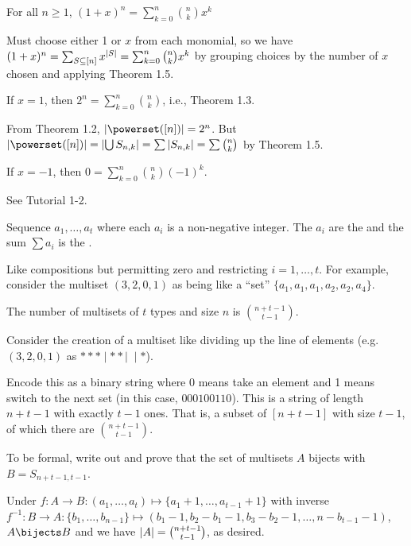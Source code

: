 \begin{theorem}
  For all $n \geq 1$, $(1+x)^n = \sum_{k=0}^n \binom{n}{k}x^k$
\end{theorem}
\begin{prf}
  Must choose either 1 or $x$ from each monomial,
  so we have $(1+x)^n = \sum_{S \subseteq [n]} x^{\abs{S}} = \sum_{k=0}^n\binom{n}{k}x^k$
  by grouping choices by the number of $x$ chosen and applying Theorem 1.5.
\end{prf}

\begin{corollary}
  If $x=1$, then $2^n = \sum_{k=0}^n \binom{n}{k}$, i.e., Theorem 1.3.
\end{corollary}
\begin{prf}
  From Theorem 1.2, $\abs{\powerset([n])} = 2^n$.
  But $\abs{\powerset([n])} = \abs{\bigcup S_{n,k}}
    = \sum \abs{S_{n,k}} = \sum \binom{n}{k}$ by Theorem 1.5.
\end{prf}

\begin{corollary}
  If $x=-1$, then $0 = \sum_{k=0}^n \binom{n}{k}(-1)^k$.
\end{corollary}
\begin{prf}
  See Tutorial 1-2.
\end{prf}

\begin{defn}
  Sequence $a_1,\dotsc,a_t$ where each $a_i$ is a non-negative integer.
  The $a_i$ are the 
  and the sum $\sum a_i$ is the .
\end{defn}

Like compositions but permitting zero and restricting $i = 1,\dotsc,t$.
For example, consider the multiset $(3,2,0,1)$ as being like a ``set'' $\{a_1,a_1,a_1,a_2,a_2,a_4\}$.

\begin{theorem}[1.9]
  The number of multisets of $t$ types and size $n$ is $\binom{n+t-1}{t-1}$.
\end{theorem}
\begin{prf}
  Consider the creation of a multiset like dividing up the line of elements
  (e.g. $(3,2,0,1)$ as $***\mid**\mid\;\mid*$).

  Encode this as a binary string where 0 means take an element
  and 1 means switch to the next set (in this case, $000100110$).
  This is a string of length $n+t-1$ with exactly $t-1$ ones.
  That is, a subset of $[n+t-1]$ with size $t-1$, of which there are $\binom{n+t-1}{t-1}$.

  To be formal, write out and prove that the set of multisets $A$ bijects with $B=S_{n+t-1,t-1}$.

  Under $f : A \to B : (a_1,\dotsc,a_t) \mapsto \{a_1+1,\dotsc,a_{t-1}+1\}$
  with inverse $f^{-1} : B \to A : \{b_1,\dotsc,b_{n-1}\} \mapsto (b_1-1,b_2-b_1-1,b_3-b_2-1,\dotsc,n-b_{t-1}-1)$,
  $A \bijects B$ and we have $\abs{A} = \binom{n+t-1}{t-1}$, as desired.
\end{prf}

